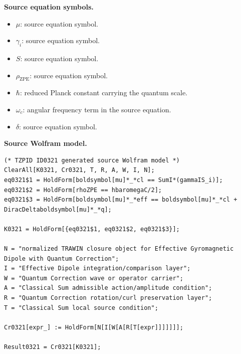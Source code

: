 \begin{minipage}[t]{0.49\linewidth}
\begingroup
\small
\raggedright
\textbf{Source equation symbols.}\par
\begin{itemize}[leftmargin=1.35em,itemsep=1pt,topsep=1pt,parsep=0pt]
    \item $\mu$: source equation symbol.
    \item $\gamma_i$: source equation symbol.
    \item $S$: source equation symbol.
    \item $\rho_{\mathrm{ZPE}}$: source equation symbol.
    \item $\hbar$: reduced Planck constant carrying the quantum scale.
    \item $\omega_c$: angular frequency term in the source equation.
    \item $\delta$: source equation symbol.
\end{itemize}
\endgroup
\end{minipage}\hfill
\begin{minipage}[t]{0.47\linewidth}
\begingroup
\scriptsize
\raggedright
\textbf{Source Wolfram model.}\par
\begin{Verbatim}[fontsize=\tiny,breaklines=true,breakanywhere=true]
(* TZPID ID0321 generated source Wolfram model *)
ClearAll[K0321, Cr0321, T, R, A, W, I, N];
eq0321$1 = HoldForm[boldsymbol[mu]*_*cl == SumI*(gammaIS_i)];
eq0321$2 = HoldForm[rhoZPE == hbaromegaC/2];
eq0321$3 = HoldForm[boldsymbol[mu]*_*eff == boldsymbol[mu]*_*cl + DiracDeltaboldsymbol[mu]*_*q];

K0321 = HoldForm[{eq0321$1, eq0321$2, eq0321$3}];

N = "normalized TRAWIN closure object for Effective Gyromagnetic Dipole with Quantum Correction";
I = "Effective Dipole integration/comparison layer";
W = "Quantum Correction wave or operator carrier";
A = "Classical Sum admissible action/amplitude condition";
R = "Quantum Correction rotation/curl preservation layer";
T = "Classical Sum local source condition";

Cr0321[expr_] := HoldForm[N[I[W[A[R[T[expr]]]]]]];

Result0321 = Cr0321[K0321];
\end{Verbatim}
\endgroup
\end{minipage}

